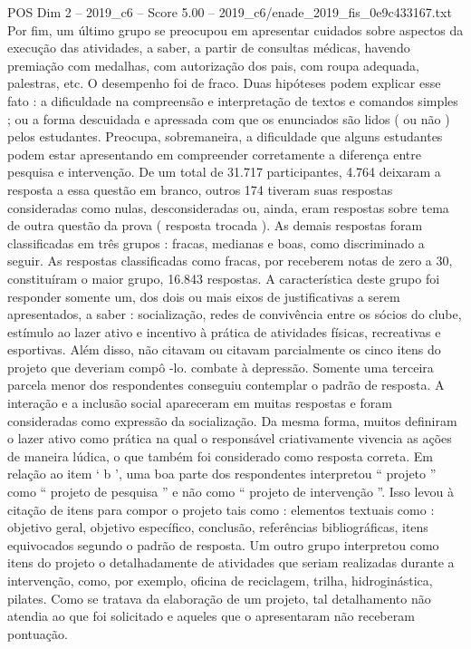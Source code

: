 \begin{textsample}{POS Dim 2 – 2019\_c6 – Score 5.00 – 2019\_c6/enade\_2019\_fis\_0e9c433167.txt}
Por fim, um último grupo se preocupou em apresentar cuidados sobre aspectos da execução das atividades, a saber, a partir de consultas médicas, havendo premiação com medalhas, com autorização dos pais, com roupa adequada, palestras, etc.
O desempenho foi de fraco.
Duas hipóteses podem explicar esse fato : a dificuldade na compreensão e interpretação de textos e comandos simples ; ou a forma descuidada e apressada com que os enunciados são lidos ( ou não ) pelos estudantes.
Preocupa, sobremaneira, a dificuldade que alguns estudantes podem estar apresentando em compreender corretamente a diferença entre pesquisa e intervenção.
De um total de 31.717 participantes, 4.764 deixaram a resposta a essa questão em branco, outros 174 tiveram suas respostas consideradas como nulas, desconsideradas ou, ainda, eram respostas sobre tema de outra questão da prova ( resposta trocada ).
As demais respostas foram classificadas em três grupos : fracas, medianas e boas, como discriminado a seguir.
As respostas classificadas como fracas, por receberem notas de zero a 30, constituíram o maior grupo, 16.843 respostas.
A característica deste grupo foi responder somente um, dos dois ou mais eixos de justificativas a serem apresentados, a saber : socialização, redes de convivência entre os sócios do clube, estímulo ao lazer ativo e incentivo à prática de atividades físicas, recreativas e esportivas.
Além disso, não citavam ou citavam parcialmente os cinco itens do projeto que deveriam compô -lo. combate à depressão.
Somente uma terceira parcela menor dos respondentes conseguiu contemplar o padrão de resposta.
A interação e a inclusão social apareceram em muitas respostas e foram consideradas como expressão da socialização.
Da mesma forma, muitos definiram o lazer ativo como prática na qual o responsável criativamente vivencia as ações de maneira lúdica, o que também foi considerado como resposta correta.
Em relação ao item ‘ b ’, uma boa parte dos respondentes interpretou “ projeto ” como “ projeto de pesquisa ” e não como “ projeto de intervenção ”.
Isso levou à citação de itens para compor o projeto tais como : elementos textuais como : objetivo geral, objetivo específico, conclusão, referências bibliográficas, itens equivocados segundo o padrão de resposta.
Um outro grupo interpretou como itens do projeto o detalhadamente de atividades que seriam realizadas durante a intervenção, como, por exemplo, oficina de reciclagem, trilha, hidroginástica, pilates.
Como se tratava da elaboração de um projeto, tal detalhamento não atendia ao que foi solicitado e aqueles que o apresentaram não receberam pontuação.

\end{textsample}
